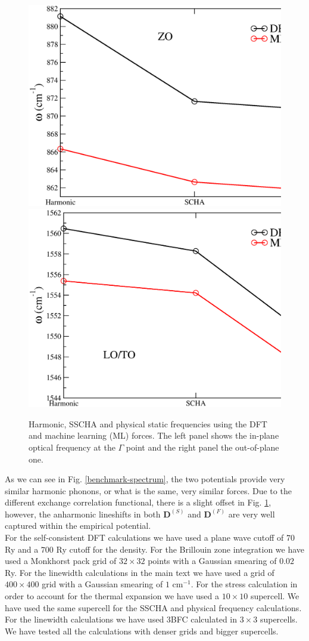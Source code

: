 \begin{figure}[ht]
\includegraphics[width=0.49\linewidth]{Figures/bm1.eps}
\includegraphics[width=0.49\linewidth]{Figures/bm2.eps}
\caption[Harmonic, SSCHA and physical static frequencies using the DFT and machine learning (ML) forces.]{Harmonic, 
	SSCHA and physical static frequencies using the DFT and machine learning (ML) forces. The left panel shows 
	the in-plane optical frequency at the $\Gamma$ point and the right panel the out-of-plane one.}
\label{benchmark}
\end{figure}
As we can see in Fig. \ref{benchmark-spectrum}, the two potentials provide very similar harmonic phonons, or what is 
the same, very similar forces. Due to the different exchange correlation functional, there is a slight offset in 
Fig. \ref{benchmark}, however, the anharmonic lineshifts in both $\boldsymbol{D}^{(S)}$ and $\boldsymbol{D}^{(F)}$ 
are very well captured within the empirical potential. \\

For the self-consistent DFT calculations we have used a plane wave cutoff of $70$ Ry and a $700$ Ry cutoff for the 
density. For the Brillouin zone integration we have used a Monkhorst pack grid\cite{monkhorst1976special} of 
$32\times32$ points with a Gaussian smearing of $0.02$ Ry. For the linewidth calculations in the main text we have 
used a grid of $400\times400$ grid with a Gaussian smearing of $1$ cm$^{-1}$. For the stress calculation in order 
to account for the thermal expansion we have used a $10\times10$ supercell. We have used the same supercell for 
the SSCHA and physical frequency calculations. For the linewidth calculations we have used 3BFC calculated in 
$3\times3$ supercells. We have tested all the calculations with denser grids and bigger supercells.


